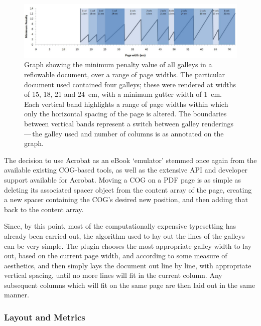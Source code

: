 \begin{figure}
    \centering
    \includegraphics[width=\textwidth]{gfx/graph-em}
    \caption[Layout Penalty Graph]{Graph showing the minimum penalty value of
all galleys in a reflowable document, over a
range of page widths. The particular document used contained four galleys; these were rendered at
widths of 15, 18, 21 and 24~em, with a minimum gutter width of 1~em. Each vertical band highlights a
range of page widths within which only the horizontal spacing of the page is altered. The boundaries
between vertical bands represent a switch between galley renderings\,---\,the galley used and number
of columns is as annotated on the graph.}\vspace{-3pt}
    \label{graph}
\end{figure}

The decision to use Acrobat as an eBook `emulator' stemmed once again from the available existing
COG-based tools, as well as the extensive API and developer support available for Acrobat. Moving a
COG on a PDF page is as simple as deleting its associated spacer object from the content array of
the page, creating a new spacer containing the COG's desired new position, and then adding that back
to the content array.

Since, by this point, most of the computationally expensive typesetting has already been carried
out, the algorithm used to lay out the lines of the galleys can be very simple. The plugin chooses
the most appropriate galley width to lay out, based on the current page width, and according to some
measure of aesthetics, and then simply lays the document out line by line, with appropriate vertical
spacing, until no more lines will fit in the current column. Any subsequent columns which will fit
on the same page are then laid out in the same manner.


\subsubsection{Layout and Metrics}


